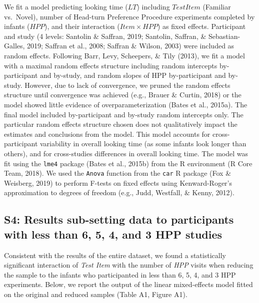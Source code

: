 \documentclass[english,man,man,floatsintext]{apa6}
\begin{document}
\begin{appendix}
We fit a model predicting looking time (\(LT\)) including \(TestItem\)
(Familiar vs.~Novel), number of Head-turn Preference Procedure
experiments completed by infants (\(HPP\)), and their interaction
(\(Item \times HPP\)) as fixed effects. Participant and study (4 levels:
Santolin \& Saffran, 2019; Santolin, Saffran, \& Sebastian-Galles, 2019;
Saffran et al., 2008; Saffran \& Wilson, 2003) were included as random
effects. Following Barr, Levy, Scheepers, \& Tily (2013), we fit a model
with a maximal random effects structure including random intercepts
by-participant and by-study, and random slopes of HPP by-participant and
by-study. However, due to lack of convergence, we pruned the random
effects structure until convergence was achieved (e.g., Brauer \&
Curtin, 2018) or the model showed little evidence of
overparameterization (Bates et al., 2015a). The final model included
by-participant and by-study random intercepts only. The particular
random effects structure chosen does not qualitatively impact the
estimates and conclusions from the model. This model accounts for
cross-participant variability in overall looking time (as some infants
look longer than others), and for cross-studies differences in overall
looking time. The model was fit using the \texttt{lme4} package (Bates
et al., 2015b) from the R environment (R Core Team, 2018). We used the
\texttt{Anova} function from the \texttt{car} R package (Fox \&
Weisberg, 2019) to perform F-tests on fixed effects using
Kenward-Roger's approximation to degrees of freedom (e.g., Judd,
Westfall, \& Kenny, 2012).

\hypertarget{s4-results-sub-setting-data-to-participants-with-less-than-6-5-4-and-3-hpp-studies}{%
\subsection{S4: Results sub-setting data to participants with less than
6, 5, 4, and 3 HPP
studies}\label{s4-results-sub-setting-data-to-participants-with-less-than-6-5-4-and-3-hpp-studies}}

Consistent with the results of the entire dataset, we found a
statistically significant interaction of \emph{Test Item} with the
number of \emph{HPP} visits when reducing the sample to the infants who
participanted in less than 6, 5, 4, and 3 HPP experiments. Below, we
report the output of the linear mixed-effects model fitted on the
original and reduced samples (Table A1, Figure A1).


\end{appendix}
\end{document}
